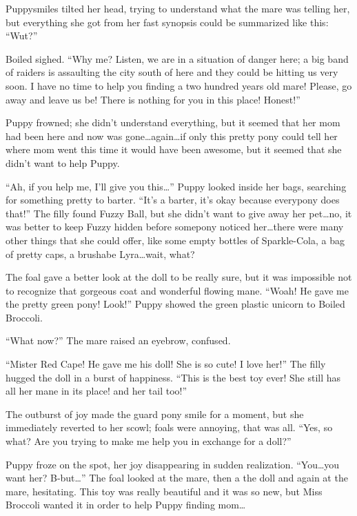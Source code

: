 Puppysmiles tilted her head, trying to understand what the mare was telling her, but everything she got from her fast synopsis could be summarized like this: ``Wut?''

Boiled sighed. ``Why me? Listen, we are in a situation of danger here; a big band of raiders is assaulting the city south of here and they could be hitting us very soon. I have no time to help you finding a two hundred years old mare! Please, go away and leave us be! There is nothing for you in this place! Honest!''

Puppy frowned; she didn't understand everything, but it seemed that her mom had been here and now was gone\dots again\dots if only this pretty pony could tell her where mom went this time it would have been awesome, but it seemed that she didn't want to help Puppy.

``Ah, if you help me, I'll give you this\dots'' Puppy looked inside her bags, searching for something pretty to barter. ``It's a barter, it's okay because everypony does that!'' The filly found Fuzzy Ball, but she didn't want to give away her pet\dots no, it was better to keep Fuzzy hidden before somepony noticed her\dots there were many other things that she could offer, like some empty bottles of Sparkle-Cola, a bag of pretty caps, a brushabe Lyra\dots wait, what?

The foal gave a better look at the doll to be really sure, but it was impossible not to recognize that gorgeous coat and wonderful flowing mane. ``Woah! He gave me the pretty green pony! Look!'' Puppy showed the green plastic unicorn to Boiled Broccoli.

``What now?'' The mare raised an eyebrow, confused.

``Mister Red Cape! He gave me his doll! She is so cute! I love her!'' The filly hugged the doll in a burst of happiness. ``This is the best toy ever! She still has all her mane in its place! and her tail too!''

The outburst of joy made the guard pony smile for a moment, but she immediately reverted to her scowl; foals were annoying, that was all. ``Yes, so what? Are you trying to make me help you in exchange for a doll?''

Puppy froze on the spot, her joy disappearing in sudden realization. ``You\dots you want her? B-but\dots'' The foal looked at the mare, then a the doll and again at the mare, hesitating. This toy was really beautiful and it was so new, but Miss Broccoli wanted it in order to help Puppy finding mom\dots

